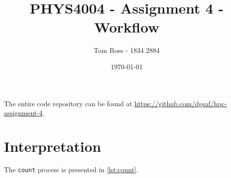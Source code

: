 \documentclass{article}
\title{PHYS4004 - Assignment 4 - Workflow}
\author{Tom Ross - 1834 2884}
\date{\today}
\begin{document}
The entire code repository can be found at
\url{https://github.com/dgsaf/hpc-assignment-4}.

\tableofcontents

\listoffigures

\clearpage

\section{Interpretation}
\label{sec:interpretation}

The \lstinline{count} process is presented in \autoref{lst:count}.


\end{document}
